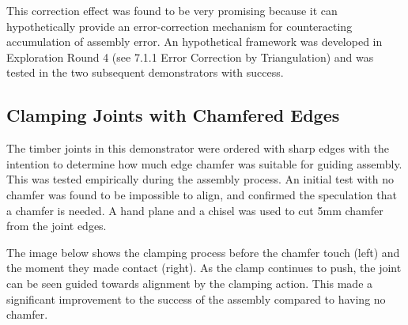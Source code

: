 This correction effect was found to be very promising because it can hypothetically provide an error-correction mechanism for counteracting accumulation of assembly error. An hypothetical framework was developed in Exploration Round 4  (see 7.1.1 Error Correction by Triangulation) and was tested in the two subsequent demonstrators with success.

\subsection{Clamping Joints with Chamfered Edges}
\label{subsection:exploration_2_clamping_joints_with_chamfered_edges}

The timber joints in this demonstrator were ordered with sharp edges with the intention to determine how much edge chamfer was suitable for guiding assembly. This was tested empirically during the assembly process. 
An initial test with no chamfer was found to be impossible to align, and confirmed the speculation that a chamfer is needed. A hand plane and a chisel was used to cut 5mm chamfer from the joint edges.

The image below shows the clamping process before the chamfer touch (left) and the moment they made contact (right). As the clamp continues to push, the joint can be seen guided towards alignment by the clamping action. This made a significant improvement to the success of the assembly compared to having no chamfer.

